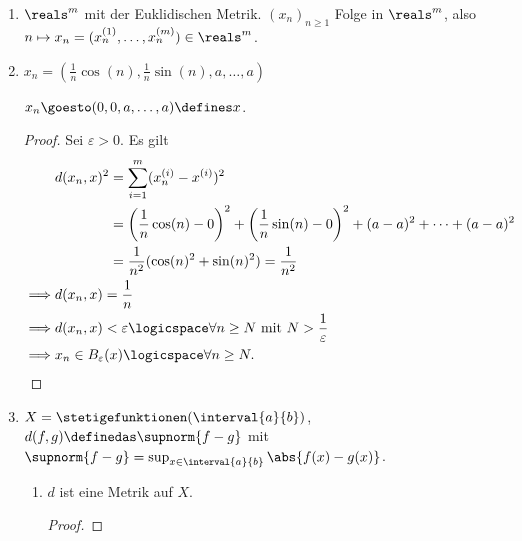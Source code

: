 \begin{beispiele}
    \begin{enumerate}
        \item \( \reals^m \) mit der Euklidischen Metrik. \( (x_n)_{n\geq 1} \) Folge in \( \reals^m \), also \( n\mapsto x_n=(x_n^{(1)},\ldots, x_n^{(m)})\in \reals^m \).
        \item \( x_n=\left( \frac{1}{n}\cos(n),\frac{1}{n}\sin(n),a,\ldots,a \right) \)
        \begin{behauptung*}
            \( x_n\goesto (0,0,a,\ldots,a)\defines x \).
        \end{behauptung*}
        \begin{proof}
            Sei \( \varepsilon>0 \). Es gilt
            \begin{align*}
                &d(x_n,x)^2 \begin{aligned}[t] 
                    &=\sum\limits_{i=1}^{m} (x_n^{(i)}-x^{(i)})^2\\
                    &=\left( \frac{1}{n}\cos(n)-0 \right)^2+\left( \frac{1}{n}\sin(n)-0 \right)^2+(a-a)^2+\cdots +(a-a)^2\\
                    &=\frac{1}{n^2}(\cos(n)^2+\sin(n)^2)=\frac{1}{n^2}
                \end{aligned}\\
                \implies &d(x_n,x)=\frac{1}{n}\\
                \implies &d(x_n,x)<\varepsilon\logicspace\forall n\geq N\text{ mit } N>\frac{1}{\varepsilon}\\
                \implies &x_n \in B_\varepsilon(x) \logicspace\forall n \geq N.
            \end{align*}            
        \end{proof}
        
        \item \( X=\stetigefunktionen(\interval{a}{b}) \), \( d(f,g)\definedas \supnorm{f-g} \) mit \( \supnorm{f-g}=\sup_{x\in \interval{a}{b}}\abs{f(x)-g(x)} \).
        \begin{enumerate}[label=\textbf{\arabic*. Beh}]
            \item \( d \) ist eine Metrik auf \( X \).
            \begin{proof}
\end{proof}
\end{enumerate}
\end{enumerate}
\end{beispiele}
